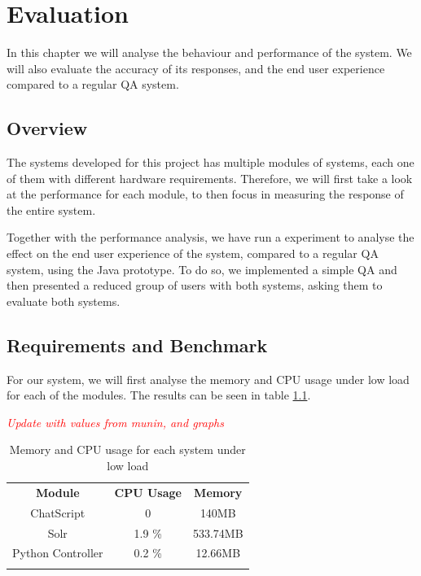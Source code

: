 \chapter{Evaluation}

\begin{chapterintro}

In this chapter we will analyse the behaviour and performance of the system. We will also evaluate the accuracy of its responses, and the end user experience compared to a regular \ac{QA} system.
 
\end{chapterintro}

\section{Overview}

The systems developed for this project has multiple modules of systems, each one of them with different hardware requirements. Therefore, we will first take a look at the performance for each module, to then focus in measuring the response of the entire system.

Together with the performance analysis, we have run a experiment to analyse the effect on the end user experience of the system, compared to a regular \ac{QA} system, using the Java prototype. To do so, we implemented a simple \ac{QA} and then presented a reduced group of users with both systems, asking them to evaluate both systems.

\section{Requirements and Benchmark}

For our system, we will first analyse the memory and CPU usage under low load for each of the modules. The results can be seen in table \ref{tab:loadmeasures}.

\emph{\textcolor{red}{Update with values from munin, and graphs}}
\begin{center}
  \centering
  \begin{table}
    \begin{tabular*}{0.7\textwidth}{| c | c | c |}
      \hhline{|-|-|-|}
      \textbf{Module} & \textbf{CPU Usage} & \textbf{Memory} \\ \hhline{|=|=|=|}
      ChatScript & 0 &  140MB \\ \hhline{|-|-|-|}
      Solr & 1.9 \% & 533.74MB \\ \hhline{|-|-|-|}
      Python Controller & 0.2 \% & 12.66MB \\ \hhline{|-|-|-|} 
      \end{tabular*}
    \caption{Memory and CPU usage for each system under low load}
    \label{tab:loadmeasures}
  \end{table}
\end{center}


